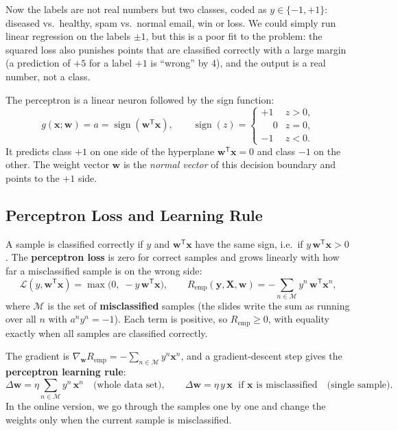\documentclass[11pt, oneside]{book}
\newcommand{\grad}{\nabla}               %
\newcommand{\T}{^{\mathsf{T}}}           %
\newcommand{\loss}{\mathcal{L}}          %
\newcommand{\params}{\boldsymbol{\theta}}   %
\DeclareMathOperator{\sign}{sign}
\newcommand{\bx}{\bm{x}}        \newcommand{\by}{\bm{y}}
\newcommand{\bw}{\bm{w}}        \newcommand{\bW}{\bm{W}}
\newcommand{\bX}{\bm{X}}        \newcommand{\bY}{\bm{Y}}
\newcommand{\Remp}{R_{\mathrm{emp}}}     %
\let\originalsubsection\subsection
\renewcommand{\subsection}{\Needspace{6\baselineskip}\originalsubsection}
\begin{document}
Now the labels are not real numbers but two classes, coded as
$y \in \{-1, +1\}$: diseased vs.\ healthy, spam vs.\ normal email, win or
loss. We could simply run linear regression on the labels $\pm 1$, but this is
a poor fit to the problem: the squared loss also punishes points that are
classified correctly with a large margin (a prediction of $+5$ for a label
$+1$ is ``wrong'' by 4), and the output is a real number, not a class.

\begin{defbox}[title={Perceptron}]
The perceptron is a linear neuron followed by the sign function:
\[
  g(\bx; \bw) = a = \sign(\bw\T\bx), \qquad
  \sign(z) = \begin{cases} +1 & z > 0, \\ \phantom{+}0 & z = 0, \\ -1 & z < 0. \end{cases}
\]
It predicts class $+1$ on one side of the hyperplane $\bw\T\bx = 0$ and class
$-1$ on the other. The weight vector $\bw$ is the \emph{normal vector} of this
decision boundary and points to the $+1$ side.
\end{defbox}

\subsection{Perceptron Loss and Learning Rule}

A sample is classified correctly if $y$ and $\bw\T\bx$ have the same sign,
i.e.\ if $y\,\bw\T\bx > 0$. The \textbf{perceptron loss} is zero for correct
samples and grows linearly with how far a misclassified sample is on the
wrong side:
\[
  \loss(y, \bw\T\bx) = \max\bigl(0,\; -y\,\bw\T\bx\bigr),
  \qquad
  \Remp(\by, \bX, \bw) = -\sum_{n \in \mathcal{M}} y^n\, \bw\T\bx^n,
\]
where $\mathcal{M}$ is the set of \textbf{misclassified} samples (the slides
write the sum as running over all $n$ with $a^n y^n = -1$). Each term is
positive, so $\Remp \ge 0$, with equality exactly when all samples are
classified correctly.

The gradient is $\grad_{\bw}\Remp = -\sum_{n\in\mathcal{M}} y^n\bx^n$, and a
gradient-descent step gives the \textbf{perceptron learning rule}:
\[
  \Delta\bw = \eta \sum_{n \in \mathcal{M}} y^n\, \bx^n
  \quad\text{(whole data set)},
  \qquad
  \Delta\bw = \eta\, y\, \bx \;\text{ if } \bx \text{ is misclassified}
  \quad\text{(single sample)}.
\]
In the online version, we go through the samples one by one and change the
weights only when the current sample is misclassified.
\end{document}
